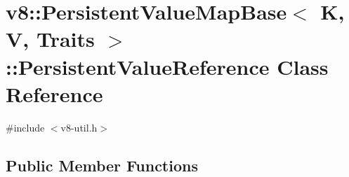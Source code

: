 \hypertarget{classv8_1_1_persistent_value_map_base_1_1_persistent_value_reference}{}\section{v8\+:\+:Persistent\+Value\+Map\+Base$<$ K, V, Traits $>$\+:\+:Persistent\+Value\+Reference Class Reference}
\label{classv8_1_1_persistent_value_map_base_1_1_persistent_value_reference}


{\ttfamily \#include $<$v8-\/util.\+h$>$}

\subsection*{Public Member Functions}
